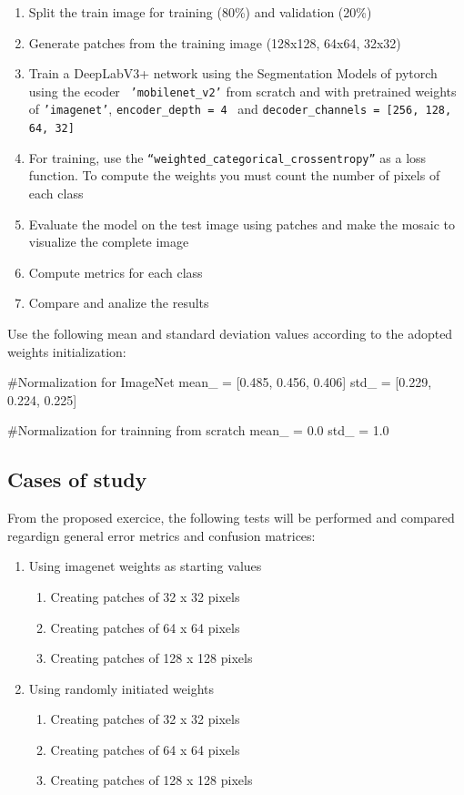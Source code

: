 \documentclass[10pt, a4paper]{article}
\begin{document}
\begin{enumerate}
  \item Split the train image for training (80\%) and validation (20\%)
  \item Generate patches from the training image (128x128, 64x64, 32x32)
  \item Train a DeepLabV3+ network using the Segmentation Models of pytorch using the ecoder \ 
        {\tt 'mobilenet\_v2'} from scratch and with pretrained weights of {\tt 'imagenet'}, {\tt encoder\_depth = 4} \
        and {\tt decoder\_channels = [256, 128, 64, 32]}
  \item For training, use the {\tt “weighted\_categorical\_crossentropy”} as a loss function. To compute the weights you must count the number of pixels of each class
  \item Evaluate the model on the test image using patches and make the mosaic to visualize the complete image
  \item Compute metrics for each class
  \item Compare and analize the results
\end{enumerate}

Use the following mean and standard deviation values according to the adopted weights initialization:

\begin{python}
  #Normalization for ImageNet
  mean_ = [0.485, 0.456, 0.406]
  std_  = [0.229, 0.224, 0.225]

  #Normalization for trainning from scratch
  mean_ = 0.0
  std_  = 1.0
\end{python}

\subsection{Cases of study}

From the proposed exercice, the following tests will be performed and compared regardign general error metrics and confusion matrices:

\begin{enumerate}
  \item Using imagenet weights as starting values\label{item:1}
  \begin{enumerate}[a]
    \item Creating patches of 32 x 32 pixels\label{item:1a}
    \item Creating patches of 64 x 64 pixels\label{item:1b}
    \item Creating patches of 128 x 128 pixels\label{item:1c}
  \end{enumerate}
  \item Using randomly initiated weights\label{item:2}
  \begin{enumerate}[a]
    \item Creating patches of 32 x 32 pixels\label{item:2a}
    \item Creating patches of 64 x 64 pixels\label{item:2b}
    \item Creating patches of 128 x 128 pixels\label{item:2c}
  \end{enumerate}
\end{enumerate}
\end{document}

